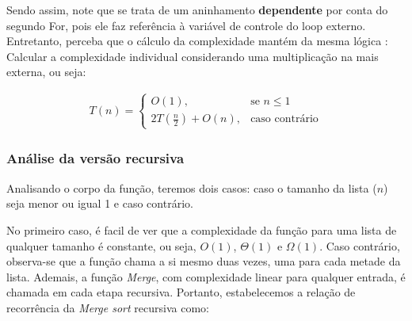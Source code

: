 \begin{algorithm}
	\begin{algorithmic}[0]


		\EndFor
		\EndFor
	\end{algorithmic}
\end{algorithm}

Sendo assim, note que se trata de um aninhamento \textbf{dependente} por conta do segundo For, pois ele faz referência à variável de controle do loop externo. Entretanto, perceba que o cálculo da complexidade mantém da mesma lógica : Calcular a complexidade individual considerando uma multiplicação na mais externa, ou seja:

\begin{align*}
	\label{recc:rec_merge_sort}
	T(n) =
	\begin{cases}
		O(1),                   & \text{se $n \leq 1$}  \\
		2T(\frac{n}{2}) + O(n), & \text{caso contrário}
	\end{cases}
\end{align*}


\subsubsection{Análise da versão recursiva}

Analisando o corpo da função, teremos dois casos: caso o tamanho da lista ($n$) seja menor ou igual 1 e caso contrário.

\begin{algorithm}
	\begin{algorithmic}[0]
		 \Return
		\EndIf
		\State {}
	\end{algorithmic}
\end{algorithm}
\FloatBarrier

No primeiro caso, é facil de ver que a complexidade da função para uma lista de qualquer tamanho é constante, ou seja, $O(1)$, $\Theta(1)$ e $\Omega(1)$. Caso contrário, observa-se que a função chama a si mesmo duas vezes, uma para cada metade da lista. Ademais, a função \textit{Merge}, com complexidade linear para qualquer entrada, é chamada em cada etapa recursiva. Portanto, estabelecemos a relação de recorrência da \textit{Merge sort} recursiva como:

